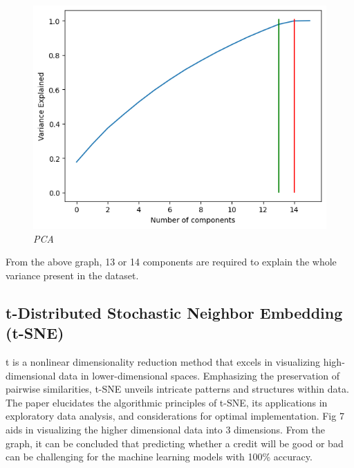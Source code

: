 \documentclass[10pt]{article}
\begin{document}
\begin{multicols}{2}
\begin{figure}[H]
    \centering
    \includegraphics[width=1\linewidth]{figure6.png}
    \caption{\justifying \textit{PCA}}
    \label{fig:PID Fuzzy}
\end{figure}
From the above graph, 13 or 14 components are required to explain the whole variance present in the dataset. 

\subsection{t-Distributed Stochastic Neighbor Embedding (t-SNE)}
t is a nonlinear dimensionality reduction method that excels in visualizing high-dimensional data in lower-dimensional spaces. Emphasizing the preservation of pairwise similarities, t-SNE unveils intricate patterns and structures within data. The paper elucidates the algorithmic principles of t-SNE, its applications in exploratory data analysis, and considerations for optimal implementation. Fig 7 aids in visualizing the higher dimensional data into 3 dimensions. From the graph, it can be concluded that predicting whether a credit will be good or bad can be challenging for the machine learning models with 100\% accuracy.


\end{multicols}
\end{document}
